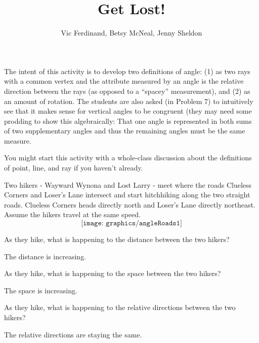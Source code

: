 \documentclass{ximera}
\title{Get Lost!}
\author{Vic Ferdinand, Betsy McNeal, Jenny Sheldon}
\begin{document}
\begin{abstract}
\end{abstract}
\maketitle

\begin{instructorIntro}
The intent of this activity is to develop two definitions of angle:
(1) as two rays with a common vertex and the attribute measured by an angle is the relative direction between the rays (as opposed to a ``spacey'' measurement), and (2) as an amount of rotation.  The students are also asked (in Problem 7) to intuitively see that it makes sense for vertical angles to be congruent (they may need some prodding to show this algebraically:  That one angle is represented in both sums of two supplementary angles and thus the remaining angles must be the same measure.

You might start this activity with a whole-class discussion about the definitions of point, line, and ray if you haven't already.
\end{instructorIntro}

Two hikers - Wayward Wynona and Lost Larry - meet where the roads Clueless Corners and Loser's Lane intersect and start hitchhiking along the two straight roads.  Clueless Corners heads directly north and Loser’s Lane directly northeast.  Assume the hikers travel at the same speed.
\[
\texttt{[image: graphics/angleRoads1]}
\]

\begin{problem}
As they hike, what is happening to the distance between the two hikers?
\begin{solution}
The distance is increasing.
\end{solution}
\end{problem}

\begin{problem}
As they hike, what is happening to the space between the two hikers?
\begin{solution}
The space is increasing.
\end{solution}
\end{problem}

\begin{problem}
As they hike, what is happening to the relative directions between the two hikers?
\begin{solution}
The relative directions are staying the same.
\end{solution}
\end{problem}
\end{document}
